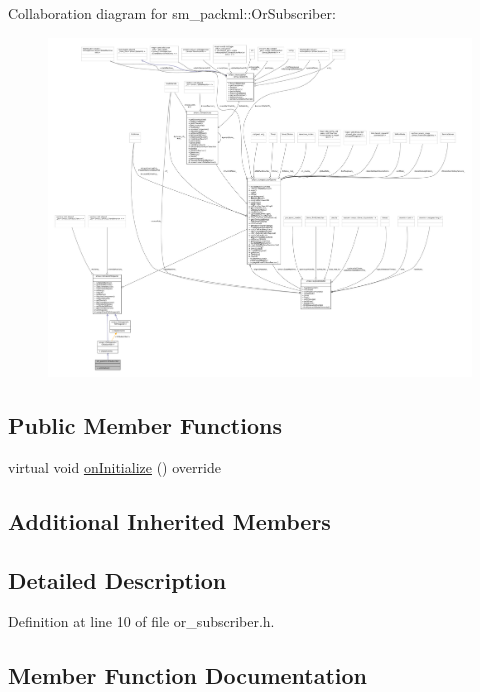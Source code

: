 Collaboration diagram for sm\+\_\+packml\+:\+:Or\+Subscriber\+:
\nopagebreak
\begin{figure}[H]
\begin{center}
\leavevmode
\includegraphics[width=350pt]{classsm__packml_1_1OrSubscriber__coll__graph}
\end{center}
\end{figure}
\subsection*{Public Member Functions}
\begin{DoxyCompactItemize}
\item 
virtual void \hyperlink{classsm__packml_1_1OrSubscriber_a21c2958e73930f7260832656f664a769}{on\+Initialize} () override
\end{DoxyCompactItemize}
\subsection*{Additional Inherited Members}


\subsection{Detailed Description}


Definition at line 10 of file or\+\_\+subscriber.\+h.



\subsection{Member Function Documentation}
\mbox{\label{classsm__packml_1_1OrSubscriber_a21c2958e73930f7260832656f664a769}} 
